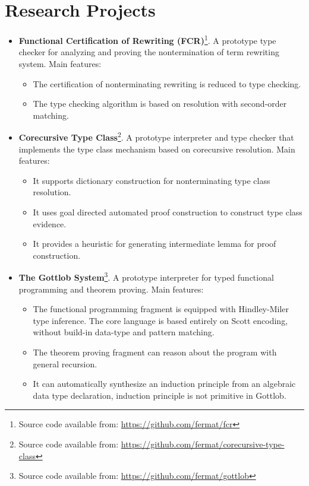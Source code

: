 \documentclass{article}
\begin{document}
\section*{Research Projects}
\begin{itemize}
\item \textbf{Functional Certification of Rewriting (FCR)}\footnote{Source code available from: \url{https://github.com/fermat/fcr}}. A prototype type checker for analyzing and proving the nontermination of term rewriting system. Main features: 
  \begin{itemize}
  \item The certification of nonterminating rewriting is reduced to type checking.      
  \item The type checking algorithm is based on resolution with second-order matching.
  \end{itemize}
  \item \textbf{Corecursive Type Class}\footnote{Source code available from: \url{https://github.com/fermat/corecursive-type-class}}. A prototype interpreter and type checker that implements the type class mechanism based on corecursive resolution. Main features: %
    \begin{itemize}
    \item It supports dictionary construction for nonterminating type class resolution. 
     \item It uses goal directed automated proof construction to construct type class evidence.  
       \item It provides a heuristic for generating intermediate lemma for
         proof construction. 
    \end{itemize}
\item \textbf{The Gottlob System}\footnote{Source code available from:  \url{https://github.com/fermat/gottlob}}. A prototype interpreter for typed functional programming and theorem proving. Main features:
  
  \begin{itemize}
  \item The functional programming fragment is equipped with Hindley-Miler type inference. The core language is based entirely on Scott encoding, without build-in data-type and pattern matching.
     \item The theorem proving fragment can reason about the program with general recursion. 

  \item It can automatically synthesize an induction principle from an algebraic data type declaration, induction principle is not primitive in Gottlob. 


\end{itemize}
\end{itemize}
\end{document}
